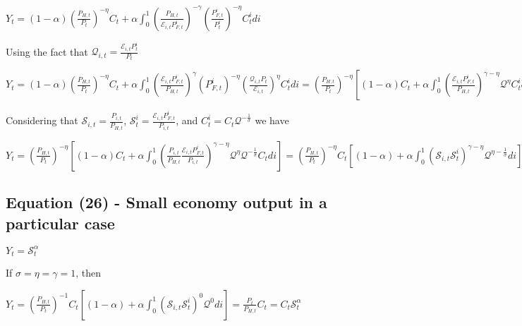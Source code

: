 \documentclass[
]{article}
\begin{document}
\(\displaystyle Y_t = (1-\alpha)\left( \frac{P_{H,t}}{P_t} \right)^{-\eta}C_t + \alpha \int_0^1 \left( \frac{P_{H,t}}{\mathcal{E}_{i,t}P_{F,t}^i}\right)^{-\gamma} \left( \frac{P_{F,t}^i}{P_t^i} \right)^{-\eta} C_t^i di\)

Using the fact that
\(\displaystyle \mathcal{Q}_{i,t}= \frac{\mathcal{E}_{i,t} P_t^i}{P_t}\)

\(\displaystyle Y_t = (1-\alpha)\left( \frac{P_{H,t}}{P_t} \right)^{-\eta}C_t + \alpha \int_0^1 \left( \frac{\mathcal{E}_{i,t}P_{F,t}^i}{P_{H,t}}\right)^{\gamma} \left( P_{F,t}^i \right)^{-\eta} \left( \frac{\mathcal{Q}_{i,t}P_t}{\mathcal{E}_{i,t}} \right)^\eta C_t^i di = \left( \frac{P_{H,t}}{P_t} \right)^{-\eta} \left[ (1-\alpha)C_t + \alpha \int_0^1 \left( \frac{\mathcal{E}_{i,t}P_{F,t}^i}{P_{H,t}}\right)^{\gamma-\eta} \mathcal{Q}^\eta C_t^i di \right]\)

Considering that
\(\displaystyle \mathcal{S}_{i,t}=\frac{P_{i,t}}{P_{H,t}}\),
\(\displaystyle \mathcal{S}_t^i=\frac{\mathcal{E}_{i,t} P_{F,t}^i}{P_{i,t}}\),
and \(C_{t}^i=C_t \mathcal{Q}^{-\frac{1}{\sigma}}\) we have

\(\displaystyle Y_t = \left( \frac{P_{H,t}}{P_t} \right)^{-\eta} \left[ (1-\alpha)C_t + \alpha \int_0^1 \left( \frac{P_{i,t}}{P_{H,t}} \frac{\mathcal{E}_{i,t}P_{F,t}^i}{P_{i,t}}\right)^{\gamma-\eta} \mathcal{Q}^\eta \mathcal{Q}^{-\frac{1}{\sigma}} C_t di \right] = \left( \frac{P_{H,t}}{P_t} \right)^{-\eta}C_t \left[ (1-\alpha) + \alpha \int_0^1 \left( \mathcal{S}_{i,t} \mathcal{S}_t^i\right)^{\gamma-\eta} \mathcal{Q}^{\eta-\frac{1}{\sigma}} di \right]\)

\vspace{12pt}

\hypertarget{equation-26---small-economy-output-in-a-particular-case}{%
\subsection{Equation (26) - Small economy output in a particular
case}\label{equation-26---small-economy-output-in-a-particular-case}}

\(Y_t = \mathcal{S}_t^\alpha\)

\vspace{8pt}

If \(\sigma=\eta=\gamma=1\), then

\(\displaystyle Y_t = \left( \frac{P_{H,t}}{P_t} \right)^{-1} C_t \left[ (1-\alpha) + \alpha \int_0^1 \left( \mathcal{S}_{i,t} \mathcal{S}_t^i\right)^{0} \mathcal{Q}^{0} di \right] = \frac{P_{t}}{P_{H,t}} C_t=C_t \mathcal{S}_t^\alpha\)
\end{document}
